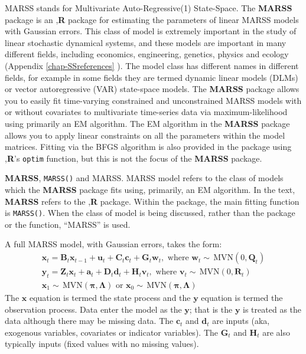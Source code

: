 \documentclass[12pt,]{book}
\begin{document}
MARSS stands for Multivariate Auto-Regressive(1) State-Space. The \textbf{MARSS} package is an ,\textbf{R} package for estimating the parameters of linear MARSS models with Gaussian errors. This class of model is extremely important in the study of linear stochastic dynamical systems, and these models are important in many different fields, including economics, engineering, genetics, physics and ecology (Appendix \ref{chap-SSreferences} ). The model class has different names in different fields, for example in some fields they are termed dynamic linear models (DLMs) or vector autoregressive (VAR) state-space models. The \textbf{MARSS} package allows you to easily fit time-varying constrained and unconstrained MARSS models with or without covariates to multivariate time-series data via maximum-likelihood using primarily an EM algorithm. The EM algorithm in the \textbf{MARSS} package allows you to apply linear constraints on all the parameters within the model matrices. Fitting via the BFGS algorithm is also provided in the package using ,\textbf{R}'s \texttt{optim} function, but this is not the focus of the \textbf{MARSS} package.

\textbf{MARSS}, \texttt{MARSS()} and MARSS. MARSS model refers to the class of models which the \textbf{MARSS} package fits using, primarily, an EM algorithm. In the text, \textbf{MARSS} refers to the ,\textbf{R} package. Within the package, the main fitting function is \texttt{MARSS()}. When the class of model is being discussed, rather than the package or the function, ``MARSS'' is used.

A full MARSS model, with Gaussian errors, takes the form:
\begin{equation}\label{eqn:marss}
\begin{gather}
\mathbf{x}_t = \mathbf{B}_t\mathbf{x}_{t-1} + \mathbf{u}_t + \mathbf{C}_t\mathbf{c}_t + \mathbf{G}_t\mathbf{w}_t, \text{ where } \mathbf{w}_t \sim \,\text{MVN}(0,\mathbf{Q}_t) \label{eqn:marssx}\\
\mathbf{y}_t = \mathbf{Z}_t\mathbf{x}_t + \mathbf{a}_t + \mathbf{D}_t\mathbf{d}_t + \mathbf{H}_t\mathbf{v}_t, \text{ where } \mathbf{v}_t \sim \,\text{MVN}(0,\mathbf{R}_t) \label{eqn:marssy}\\
\mathbf{x}_1 \sim \,\text{MVN}(\boldsymbol{\pi},\boldsymbol{\Lambda}) \text{ or } \mathbf{x}_0 \sim \,\text{MVN}(\boldsymbol{\pi},\boldsymbol{\Lambda})\label{eqn:marssx1}
\end{gather}
\end{equation}
The \(\mathbf{x}\) equation is termed the state process and the \(\mathbf{y}\) equation is termed the observation process. Data enter the model as the \(\mathbf{y}\); that is the \(\mathbf{y}\) is treated as the data although there may be missing data. The \(\mathbf{c}_t\) and \(\mathbf{d}_t\) are inputs (aka, exogenous variables, covariates or indicator variables). The \(\mathbf{G}_t\) and \(\mathbf{H}_t\) are also typically inputs (fixed values with no missing values).
\end{document}
